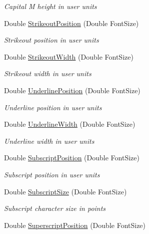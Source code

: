 \begin{DoxyCompactItemize}
\begin{DoxyCompactList}\small\item\em Capital M height in user units \end{DoxyCompactList}\item 
Double \hyperlink{class_pdf_file_writer_1_1_pdf_font_a4a91fd1d2e33600f77c92113967d3419}{Strikeout\+Position} (Double Font\+Size)
\begin{DoxyCompactList}\small\item\em Strikeout position in user units \end{DoxyCompactList}\item 
Double \hyperlink{class_pdf_file_writer_1_1_pdf_font_aa2b740c79b180845e6c4291efbb76cf5}{Strikeout\+Width} (Double Font\+Size)
\begin{DoxyCompactList}\small\item\em Strikeout width in user units \end{DoxyCompactList}\item 
Double \hyperlink{class_pdf_file_writer_1_1_pdf_font_ac853bf98d15be58ef9b3014fe12b7f9f}{Underline\+Position} (Double Font\+Size)
\begin{DoxyCompactList}\small\item\em Underline position in user units \end{DoxyCompactList}\item 
Double \hyperlink{class_pdf_file_writer_1_1_pdf_font_aa44389329af15e52a4cfa3b13c161ead}{Underline\+Width} (Double Font\+Size)
\begin{DoxyCompactList}\small\item\em Underline width in user units \end{DoxyCompactList}\item 
Double \hyperlink{class_pdf_file_writer_1_1_pdf_font_aac4d005c5682f6462181adadaa9f592f}{Subscript\+Position} (Double Font\+Size)
\begin{DoxyCompactList}\small\item\em Subscript position in user units \end{DoxyCompactList}\item 
Double \hyperlink{class_pdf_file_writer_1_1_pdf_font_a0bb668c7eb0ccd98e8fd988499a3ca72}{Subscript\+Size} (Double Font\+Size)
\begin{DoxyCompactList}\small\item\em Subscript character size in points \end{DoxyCompactList}\item 
Double \hyperlink{class_pdf_file_writer_1_1_pdf_font_a34f8dcc69274f16b10a6d8f7d4fe5978}{Superscript\+Position} (Double Font\+Size)

\end{DoxyCompactItemize}

